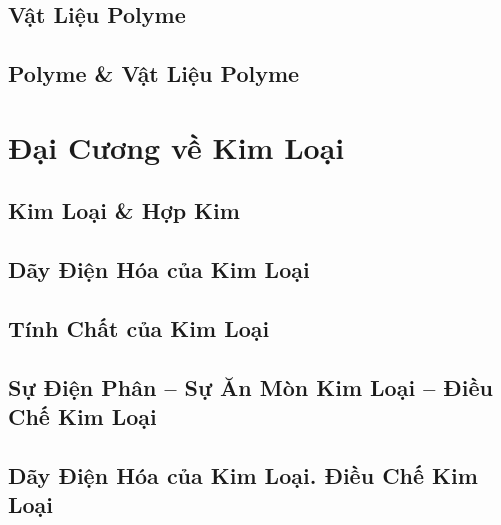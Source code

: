 \documentclass{article}
\numberwithin{equation}{section}
\begin{document}

\subsection{Vật Liệu Polyme}


\subsection{Polyme \& Vật Liệu Polyme}


\section{Đại Cương về Kim Loại}

\subsection{Kim Loại \& Hợp Kim}


\subsection{Dãy Điện Hóa của Kim Loại}


\subsection{Tính Chất của Kim Loại}


\subsection{Sự Điện Phân -- Sự Ăn Mòn Kim Loại -- Điều Chế Kim Loại}


\subsection{Dãy Điện Hóa của Kim Loại. Điều Chế Kim Loại}
\end{document}
